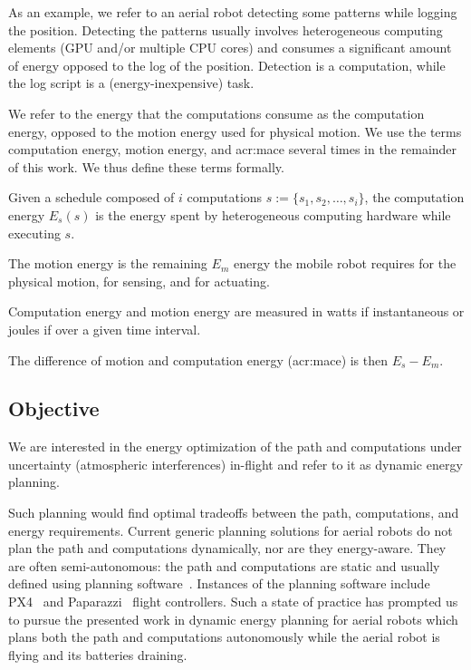 As an example, we refer to an aerial robot detecting some patterns while logging the position. Detecting the patterns usually involves heterogeneous computing elements (GPU and/or multiple CPU cores) and consumes a significant amount of energy opposed to the log of the position. Detection is a computation, while the log script is a (energy-inexpensive) task.

We refer to the energy that the computations consume as the computation energy, opposed to the motion energy used for physical motion. We use the terms computation energy, motion energy, and \Gls{acr:mace} several times in the remainder of this work. We thus define these terms formally.

\begin{highlight}
\begin{defn}
  Given a schedule composed of $i$ computations $s:=\{s_1,s_2,\dots,s_i\}$, the computation energy $E_s(s)$ is the energy spent by heterogeneous computing hardware while executing $s$.
  
  The motion energy is the remaining $E_m$ energy the mobile robot requires for the physical motion, for sensing, and for actuating.
\end{defn}
\end{highlight}

Computation energy and motion energy are measured in watts if instantaneous or joules if over a given time interval.

\begin{highlight}
  \begin{defn}
    The difference of motion and computation energy (\Gls{acr:mace}) is then $E_s-E_m$.
  \end{defn}
\end{highlight}

\subsection{Objective}

We are interested in the energy optimization of the path and computations under uncertainty (atmospheric interferences) in-flight and refer to it as dynamic energy planning.

Such planning would find optimal tradeoffs between the path, computations, and energy requirements. Current generic planning solutions for aerial robots do not plan the path and computations dynamically, nor are they energy-aware. They are often semi-autonomous: the path and computations are static and usually defined using planning software~\citep{daponte2019review}. Instances of the planning software include PX4~\citep{px4} and Paparazzi~\citep{papa} flight controllers. Such a state of practice has prompted us to pursue the presented work in dynamic energy planning for aerial robots which plans both the path and computations autonomously while the aerial robot is flying and its batteries draining. 

